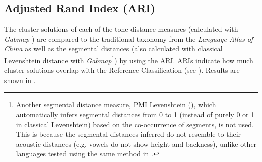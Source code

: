 \documentclass[output=paper, chinesefont]{langscibook}
\begin{document}
\subsection{Adjusted Rand Index (ARI)}
\label{sec:sung:5.3}
The cluster solutions of each of the tone distance measures (calculated with \textit{Gabmap} \citep{Nerbonne2011, Leinonen2016}) are compared to the traditional taxonomy from the \textit{Language Atlas of China} as well as the segmental distances (also calculated with classical Levenshtein distance with \textit{Gabmap}\footnote{Another segmental distance measure, PMI Levenshtein (\citealt{WielingEtAl2011}), which automatically infers segmental distances from 0 to 1 (instead of purely 0 or 1 in classical Levenshtein) based on the co-occurrence of segments, is not used. This is because the segmental distances inferred do not resemble to their acoustic distances (e.g. vowels do not show height and backness), unlike other languages tested using the same method in \citet{WielingEtAl2011}.}) by using the ARI. ARIs indicate how much cluster solutions overlap with the Reference Classification (see ). Results are shown in .
\end{document}
